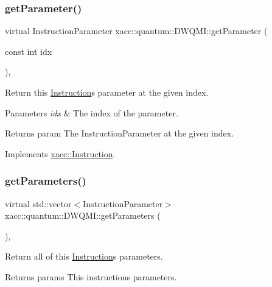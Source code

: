 \subsubsection{\texorpdfstring{get\+Parameter()}{getParameter()}}
{\footnotesize\ttfamily virtual Instruction\+Parameter xacc\+::quantum\+::\+D\+W\+Q\+M\+I\+::get\+Parameter (\begin{DoxyParamCaption}\item[{const int}]{idx }\end{DoxyParamCaption})\hspace{0.3cm}{\ttfamily [inline]}, {\ttfamily [virtual]}}

Return this \hyperlink{a01657}{Instruction}\textquotesingle{}s parameter at the given index.


\begin{DoxyParams}{Parameters}
{\em idx} & The index of the parameter. \\
\hline
\end{DoxyParams}
\begin{DoxyReturn}{Returns}
param The Instruction\+Parameter at the given index. 
\end{DoxyReturn}


Implements \hyperlink{a01657_aa0d9de97a4833a042379647f83c33ab6}{xacc\+::\+Instruction}.

\mbox{\label{a01225_a896d9a4e2876129c2cf81ef028daf1ff}} 
\subsubsection{\texorpdfstring{get\+Parameters()}{getParameters()}}
{\footnotesize\ttfamily virtual std\+::vector$<$Instruction\+Parameter$>$ xacc\+::quantum\+::\+D\+W\+Q\+M\+I\+::get\+Parameters (\begin{DoxyParamCaption}{ }\end{DoxyParamCaption})\hspace{0.3cm}{\ttfamily [inline]}, {\ttfamily [virtual]}}

Return all of this \hyperlink{a01657}{Instruction}\textquotesingle{}s parameters.

\begin{DoxyReturn}{Returns}
params This instructions parameters. 
\end{DoxyReturn}


